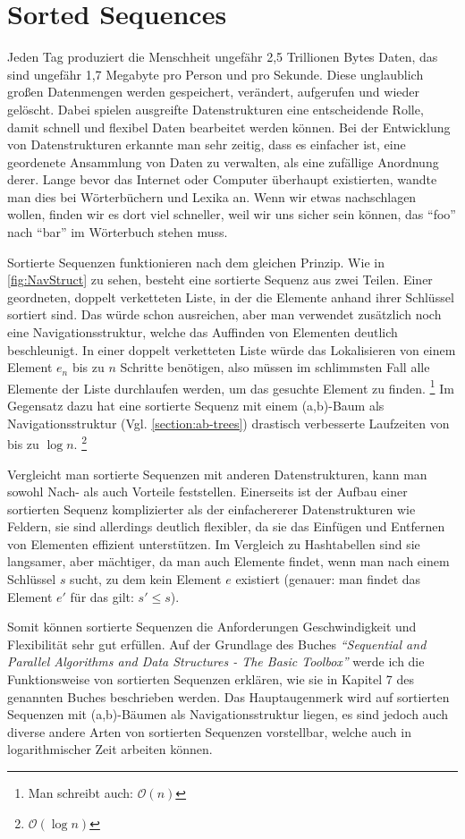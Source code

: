 
\chapter{Sorted Sequences}

Jeden Tag produziert die Menschheit ungefähr 2,5 Trillionen Bytes Daten, das sind ungefähr 1,7 Megabyte pro Person und pro Sekunde.\cite{techjury:20} Diese unglaublich großen Datenmengen werden gespeichert, verändert, aufgerufen und wieder gelöscht. Dabei spielen ausgreifte Datenstrukturen eine entscheidende Rolle, damit schnell und flexibel Daten bearbeitet werden können. Bei der Entwicklung von Datenstrukturen erkannte man sehr zeitig, dass es einfacher ist, eine geordenete Ansammlung von Daten zu verwalten, als eine zufällige Anordnung derer. Lange bevor das Internet oder Computer überhaupt existierten, wandte man dies bei Wörterbüchern und Lexika an. Wenn wir etwas nachschlagen wollen, finden wir es dort viel schneller, weil wir uns sicher sein können, das "`foo"' nach "`bar"' im Wörterbuch stehen muss.
\par
Sortierte Sequenzen funktionieren nach dem gleichen Prinzip. Wie in \autoref{fig:NavStruct} zu sehen, besteht eine sortierte Sequenz aus zwei Teilen. Einer geordneten, doppelt verketteten Liste, in der die Elemente anhand ihrer Schlüssel sortiert sind. Das würde schon ausreichen, aber man verwendet zusätzlich noch eine Navigationsstruktur, welche das Auffinden von Elementen deutlich beschleunigt. In einer doppelt verketteten Liste würde das Lokalisieren von einem Element $e_n$ bis zu $n$ Schritte benötigen, also müssen im schlimmsten Fall alle Elemente der Liste durchlaufen werden, um das gesuchte Element zu finden. \footnote{Man schreibt auch: $\mathcal{O} (n)$} Im Gegensatz dazu hat eine sortierte Sequenz mit einem (a,b)-Baum als Navigationsstruktur (Vgl. \autoref{section:ab-trees}) drastisch verbesserte Laufzeiten von bis zu $\log n$. \footnote{$\mathcal{O} (\log n)$} \cite{Sanders:19}
\par
Vergleicht man sortierte Sequenzen mit anderen Datenstrukturen, kann man sowohl Nach- als auch Vorteile feststellen. Einerseits ist der Aufbau einer sortierten Sequenz komplizierter als der einfachererer Datenstrukturen wie Feldern, sie sind allerdings deutlich flexibler, da sie das Einfügen und Entfernen von Elementen effizient unterstützen. Im Vergleich zu Hashtabellen sind sie langsamer, aber mächtiger, da man auch Elemente findet, wenn man nach einem Schlüssel $s$ sucht, zu dem kein Element $e$ existiert (genauer: man findet das Element $e'$ für das gilt: $s'\leq s$).
\par
Somit können sortierte Sequenzen die Anforderungen Geschwindigkeit und Flexibilität sehr gut erfüllen. Auf der Grundlage des Buches \textit{"`Sequential and Parallel Algorithms and Data Structures - The Basic Toolbox"'} \cite{Sanders:19} werde ich die Funktionsweise von sortierten Sequenzen erklären, wie sie in Kapitel 7 des genannten Buches beschrieben werden. Das Hauptaugenmerk wird auf sortierten Sequenzen mit (a,b)-Bäumen als Navigationsstruktur liegen, es sind jedoch auch diverse andere Arten von sortierten Sequenzen vorstellbar, welche auch in logarithmischer Zeit arbeiten können.

